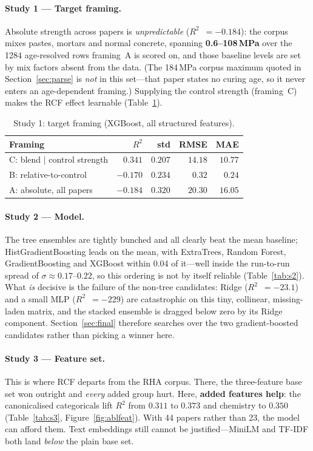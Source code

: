 \documentclass[11pt]{article}
\newcommand{\R}{$R^2$}
\begin{document}
\paragraph{Study 1 --- Target framing.}
Absolute strength across papers is \emph{unpredictable} (\R{}~$=-0.184$): the
corpus mixes pastes, mortars and normal concrete, spanning
\textbf{0.6--108\,MPa} over the 1284 age-resolved rows framing~A is scored on,
and those baseline levels are set by mix factors absent from the data. (The
184\,MPa corpus maximum quoted in Section~\ref{sec:parse} is \emph{not} in this
set---that paper states no curing age, so it never enters an age-dependent
framing.) Supplying the control strength (framing~C) makes the RCF effect learnable
(Table~\ref{tab:s1}).

\begin{table}[H]\centering\small
\caption{Study 1: target framing (XGBoost, all structured features).}
\label{tab:s1}
\begin{tabular}{lrrrr}
\toprule
Framing & \R{} & std & RMSE & MAE \\
\midrule
\rowcolor{green!12}C: blend $\mid$ control strength & $0.341$ & $0.207$ & $14.18$ & $10.77$ \\
B: relative-to-control & $-0.170$ & $0.234$ & $0.32$ & $0.24$ \\
A: absolute, all papers & $-0.184$ & $0.320$ & $20.30$ & $16.05$ \\
\bottomrule
\end{tabular}
\end{table}

\paragraph{Study 2 --- Model.}
The tree ensembles are tightly bunched and all clearly beat the mean baseline;
HistGradientBoosting leads on the mean, with ExtraTrees, Random Forest,
GradientBoosting and XGBoost within 0.04 of it---well inside the run-to-run spread
of $\sigma\approx0.17$--$0.22$, so this ordering is not by itself reliable
(Table~\ref{tab:s2}). What \emph{is} decisive is the failure of the non-tree
candidates: Ridge (\R{}~$=-23.1$) and a small MLP (\R{}~$=-229$) are catastrophic on
this tiny, collinear, missing-laden matrix, and the stacked ensemble is dragged
below zero by its Ridge component. Section~\ref{sec:final} therefore searches over
the two gradient-boosted candidates rather than picking a winner here.

\paragraph{Study 3 --- Feature set.}
This is where RCF departs from the RHA corpus. There, the three-feature base set won
outright and \emph{every} added group hurt. Here, \textbf{added features help}: the
canonicalised categoricals lift \R{} from $0.311$ to $0.373$ and chemistry to
$0.350$ (Table~\ref{tab:s3}, Figure~\ref{fig:ablfeat}). With 44 papers rather than
23, the model can afford them. Text embeddings still cannot be justified---MiniLM
and TF-IDF both land \emph{below} the plain base set.
\end{document}
